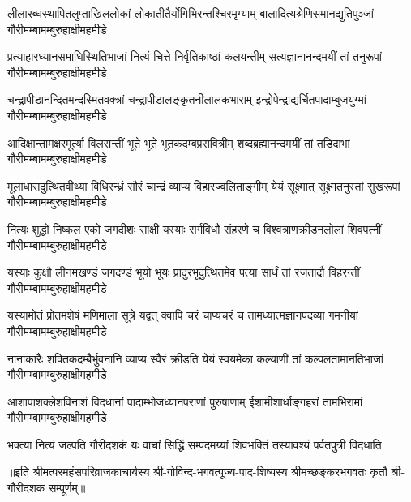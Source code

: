 


\fourlineindentedshloka
{लीलारब्धस्थापितलुप्ताखिललोकां}
{लोकातीतैर्योगिभिरन्तश्चिरमृग्याम्}
{बालादित्यश्रेणिसमानद्युतिपुञ्जां}
{गौरीमम्बामम्बुरुहाक्षीमहमीडे}

\fourlineindentedshloka
{प्रत्याहारध्यानसमाधिस्थितिभाजां}
{नित्यं चित्ते निर्वृतिकाष्ठां कलयन्तीम्}
{सत्यज्ञानानन्दमयीं तां तनुरूपां}
{गौरीमम्बामम्बुरुहाक्षीमहमीडे}

\fourlineindentedshloka
{चन्द्रापीडानन्दितमन्दस्मितवक्त्रां}
{चन्द्रापीडालङ्कृतनीलालकभाराम्}
{इन्द्रोपेन्द्राद्यर्चितपादाम्बुजयुग्मां}
{गौरीमम्बामम्बुरुहाक्षीमहमीडे}

\fourlineindentedshloka
{आदिक्षान्तामक्षरमूर्त्या विलसन्तीं}
{भूते भूते भूतकदम्बप्रसवित्रीम्}
{शब्दब्रह्मानन्दमयीं तां तडिदाभां}
{गौरीमम्बामम्बुरुहाक्षीमहमीडे}

\fourlineindentedshloka
{मूलाधारादुत्थितवीथ्या विधिरन्ध्रं}
{सौरं चान्द्रं व्याप्य विहारज्वलिताङ्गीम्}
{येयं सूक्ष्मात् सूक्ष्मतनुस्तां सुखरूपां}
{गौरीमम्बामम्बुरुहाक्षीमहमीडे}

\fourlineindentedshloka
{नित्यः शुद्धो निष्कल एको जगदीशः}
{साक्षी यस्याः सर्गविधौ संहरणे च}
{विश्वत्राणक्रीडनलोलां शिवपत्नीं}
{गौरीमम्बामम्बुरुहाक्षीमहमीडे}

\fourlineindentedshloka
{यस्याः कुक्षौ लीनमखण्डं जगदण्डं}
{भूयो भूयः प्रादुरभूदुत्थितमेव}
{पत्या सार्धं तां रजताद्रौ विहरन्तीं}
{गौरीमम्बामम्बुरुहाक्षीमहमीडे}

\fourlineindentedshloka
{यस्यामोतं प्रोतमशेषं मणिमाला}
{सूत्रे यद्वत् क्वापि चरं चाप्यचरं च}
{तामध्यात्मज्ञानपदव्या गमनीयां}
{गौरीमम्बामम्बुरुहाक्षीमहमीडे}

\fourlineindentedshloka
{नानाकारैः शक्तिकदम्बैर्भुवनानि}
{व्याप्य स्वैरं क्रीडति येयं स्वयमेका}
{कल्याणीं तां कल्पलतामानतिभाजां}
{गौरीमम्बामम्बुरुहाक्षीमहमीडे}

\fourlineindentedshloka
{आशापाशक्लेशविनाशं विदधानां}
{पादाम्भोजध्यानपराणां पुरुषाणाम्}
{ईशामीशार्धाङ्गहरां तामभिरामां}
{गौरीमम्बामम्बुरुहाक्षीमहमीडे}

{भक्त्या नित्यं जल्पति गौरीदशकं यः}
{वाचां सिद्धिं सम्पदमग्र्यां शिवभक्तिं}
{तस्यावश्यं पर्वतपुत्री विदधाति}

॥इति श्रीमत्परमहंसपरिव्राजकाचार्यस्य श्री-गोविन्द-भगवत्पूज्य-पाद-शिष्यस्य 
श्रीमच्छङ्करभगवतः कृतौ श्री-गौरीदशकं सम्पूर्णम्॥
